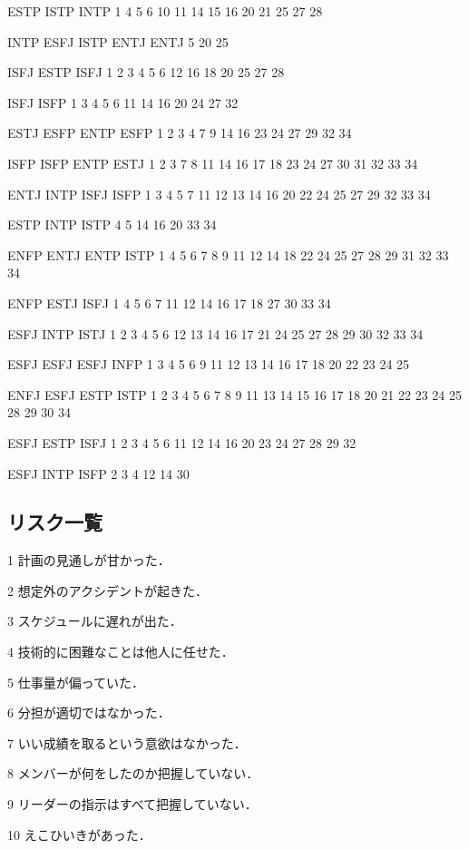 ESTP	ISTP	INTP	1	4	5	6	10	11	14	15	16	20	21	25	27	28														

INTP	ESFJ	ISTP	ENTJ	ENTJ	5	20	25																							

ISFJ	ESTP	ISFJ	1	2	3	4	5	6	12	16	18	20	25	27	28															

ISFJ	ISFP	1	3	4	5	6	11	14	16	20	24	27	32																	

ESTJ	ESFP	ENTP	ESFP	1	2	3	4	7	9	14	16	23	24	27	29	32	34													

ISFP	ISFP	ENTP	ESTJ	1	2	3	7	8	11	14	16	17	18	23	24	27	30	31	32	33	34									

ENTJ	INTP	ISFJ	ISFP	1	3	4	5	7	11	12	13	14	16	20	22	24	25	27	29	32	33	34								

ESTP	INTP	ISTP	4	5	14	16	20	33	34																					

ENFP	ENTJ	ENTP	ISTP	1	4	5	6	7	8	9	11	12	14	18	22	24	25	27	28	29	31	32	33	34						

ENFP	ESTJ	ISFJ	1	4	5	6	7	11	12	14	16	17	18	27	30	33	34													

ESFJ	INTP	ISTJ	1	2	3	4	5	6	12	13	14	16	17	21	24	25	27	28	29	30	32	33	34							

ESFJ	ESFJ	ESFJ	INFP	1	3	4	5	6	9	11	12	13	14	16	17	18	20	22	23	24	25									

ENFJ	ESFJ	ESTP	ISTP	1	2	3	4	5	6	7	8	9	11	13	14	15	16	17	18	20	21	22	23	24	25	28	29	30	34	

ESFJ	ESTP	ISFJ	1	2	3	4	5	6	11	12	14	16	20	23	24	27	28	29	32											

ESFJ	INTP	ISFP	2	3	4	12	14	30																						

\newpage

\subsection{リスク一覧}
1	計画の見通しが甘かった．

2	想定外のアクシデントが起きた．

3	スケジュールに遅れが出た．

4	技術的に困難なことは他人に任せた．

5	仕事量が偏っていた．

6	分担が適切ではなかった．

7	いい成績を取るという意欲はなかった．

8	メンバーが何をしたのか把握していない．

9	リーダーの指示はすべて把握していない．

10	えこひいきがあった．


